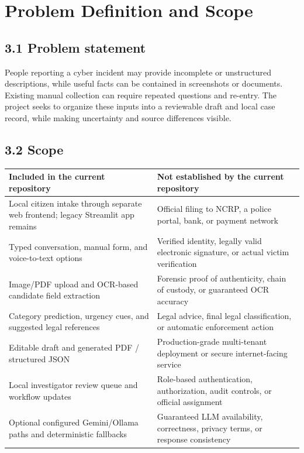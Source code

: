 \documentclass[12pt,a4paper,oneside]{report}
\begin{document}
\clearpage\chapter{Problem Definition and Scope}
\section{3.1 Problem statement}
People reporting a cyber incident may provide incomplete or unstructured descriptions, while useful facts can be contained in screenshots or documents. Existing manual collection can require repeated questions and re-entry. The project seeks to organize these inputs into a reviewable draft and local case record, while making uncertainty and source differences visible.

\section{3.2 Scope}
\begin{longtable}{p{}p{}}
\toprule
\textbf{Included in the current repository} & \textbf{Not established by the current repository} \\
\midrule
Local citizen intake through separate web frontend; legacy Streamlit app remains & Official filing to NCRP, a police portal, bank, or payment network \\
Typed conversation, manual form, and voice-to-text options & Verified identity, legally valid electronic signature, or actual victim verification \\
Image/PDF upload and OCR-based candidate field extraction & Forensic proof of authenticity, chain of custody, or guaranteed OCR accuracy \\
Category prediction, urgency cues, and suggested legal references & Legal advice, final legal classification, or automatic enforcement action \\
Editable draft and generated PDF / structured JSON & Production-grade multi-tenant deployment or secure internet-facing service \\
Local investigator review queue and workflow updates & Role-based authentication, authorization, audit controls, or official assignment \\
Optional configured Gemini/Ollama paths and deterministic fallbacks & Guaranteed LLM availability, correctness, privacy terms, or response consistency \\
\bottomrule
\end{longtable}
\end{document}
